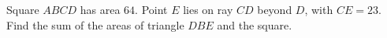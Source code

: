 Square $ABCD$ has area $64$. Point $E$ lies on ray $CD$ beyond $D$, with $CE=23$. Find the sum of the areas of triangle $DBE$ and the square.
